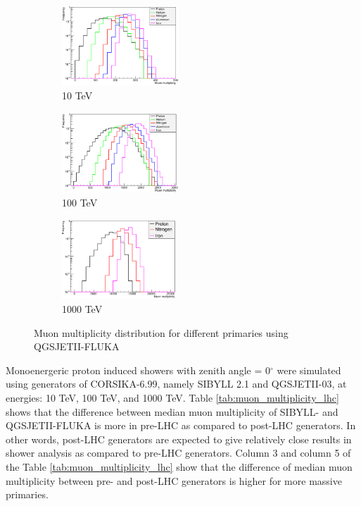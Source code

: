 \documentclass[12pt]{article}
\begin{document}
\begin{figure}
\begin{subfigure}{0.32\textwidth}
\includegraphics[width=0.9\linewidth, height=3cm]{qgsiimm10} 
\caption{10 TeV}
\label{fig:qgsiimm10}
\end{subfigure}
\begin{subfigure}{0.32\textwidth}
\includegraphics[width=0.9\linewidth, height=3cm]{qgsiimm100} 
\caption{100 TeV}
\label{fig:qgsiimm100}
\end{subfigure}
\begin{subfigure}{0.32\textwidth}
\includegraphics[width=0.9\linewidth, height = 3cm]{qgsiimm1000} 
\caption{1000 TeV}
\label{fig:qgsiimm1000}
\end{subfigure}
\caption{Muon multiplicity distribution for different primaries using QGSJETII-FLUKA}
\label{fig:qgsiimm}
\end{figure}


Monoenergeric proton induced showers with zenith angle = 0$^\circ$ were simulated using generators of CORSIKA-6.99, namely SIBYLL 2.1 and QGSJETII-03, at energies: 10 TeV, 100 TeV, and 1000 TeV. Table \ref{tab:muon_multiplicity_lhc} shows that the difference between median muon multiplicity of SIBYLL- and QGSJETII-FLUKA is more in pre-LHC as compared to post-LHC generators. In other words, post-LHC generators are expected to give relatively close results in shower analysis as compared to pre-LHC generators. Column 3 and column 5 of the Table \ref{tab:muon_multiplicity_lhc} show that the difference of median muon multiplicity between pre- and post-LHC generators is higher for more massive primaries. 
\end{document}
